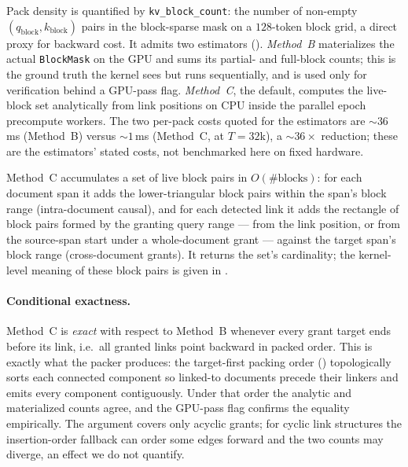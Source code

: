 Pack density is quantified by \texttt{kv\_block\_count}: the number of non-empty
$(q_\text{block}, k_\text{block})$ pairs in the block-sparse mask on a $128$-token
block grid, a direct proxy for backward cost. It admits two estimators
(). \emph{Method~B} materializes the actual
\texttt{BlockMask} on the GPU and sums its partial- and full-block counts; this
is the ground truth the kernel sees but runs sequentially, and is used only for
verification behind a GPU-pass flag. \emph{Method~C}, the default, computes the
live-block set analytically from link positions on CPU inside the parallel epoch
precompute workers. The two per-pack costs quoted for the estimators are
$\sim 36$\,ms (Method~B) versus $\sim 1$\,ms (Method~C, at $T=32$k), a
$\sim 36\times$ reduction; these are the estimators' stated costs, not benchmarked
here on fixed hardware.

Method~C accumulates a set of live block pairs in $O(\#\text{blocks})$: for each
document span it adds the lower-triangular block pairs within the span's block
range (intra-document causal), and for each detected link it adds the rectangle
of block pairs formed by the granting query range --- from the link position, or
from the source-span start under a whole-document grant --- against the target
span's block range (cross-document grants). It returns the set's cardinality; the
kernel-level meaning of these block pairs is given in .

\paragraph{Conditional exactness.}
Method~C is \emph{exact} with respect to Method~B whenever every grant target ends
before its link, i.e.\ all granted links point backward in packed order. This is
exactly what the packer produces: the target-first packing order
() topologically sorts each connected component so linked-to
documents precede their linkers and emits every component contiguously. Under
that order the analytic and materialized counts agree, and the GPU-pass flag
confirms the equality empirically. The argument covers only acyclic grants; for
cyclic link structures the insertion-order fallback can order some edges forward
and the two counts may diverge, an effect we do not quantify.


